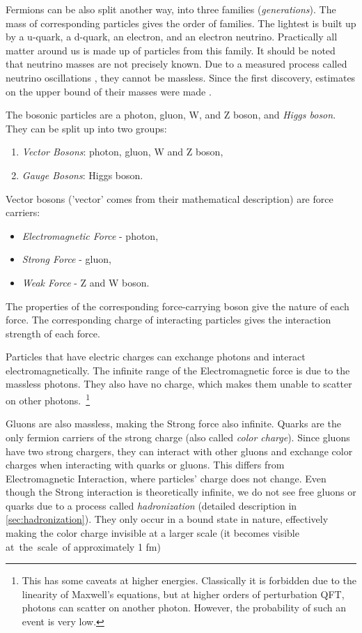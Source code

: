 Fermions can be also split another way, into three families (\emph{generations}). 
The mass of corresponding particles gives the order of families.
The lightest is built up by a u-quark, a d-quark, an electron, and an electron neutrino.
Practically all matter around us is made up of particles from this family.
It should be noted that neutrino masses are not precisely known.
Due to a measured process \cite{sadbury} called neutrino oscillations \cite{pdg}, they cannot be massless.
Since the first discovery, estimates on the upper bound of their masses were made \cite{pdg}.

The bosonic particles are a photon, gluon, W, and Z boson, and \emph{Higgs boson}. They can be split up into two groups:
\begin{enumerate}
    \item \emph{Vector Bosons}: photon, gluon, W and Z boson,
    \item \emph{Gauge Bosons}: Higgs boson.
\end{enumerate}
Vector bosons ('vector' comes from their mathematical description) are force carriers:
\begin{itemize}
    \item \emph{Electromagnetic Force} - photon,
    \item \emph{Strong Force} - gluon,
    \item \emph{Weak Force} - Z and W boson.
\end{itemize}
The properties of the corresponding force-carrying boson give the nature of each force.
The corresponding charge of interacting particles gives the interaction strength of each force.

Particles that have electric charges can exchange photons and interact electromagnetically.
The infinite range of the Electromagnetic force is due to the massless photons.
They also have no charge, which makes them unable to scatter on other photons.~\footnote{This has some caveats at higher energies. Classically it is forbidden due to the linearity of Maxwell's equations, but at higher orders of perturbation QFT, photons can scatter on another photon. However, the probability of such an event is very low.}

Gluons are also massless, making the Strong force also infinite.
Quarks are the only fermion carriers of the strong charge (also called \emph{color charge}). 
Since gluons have two strong chargers, they can interact with other gluons and exchange color charges when interacting with quarks or gluons.
This differs from Electromagnetic Interaction, where particles' charge does not change. 
Even though the Strong interaction is theoretically infinite, we do not see free gluons or quarks due to a process called \emph{hadronization} (detailed description in \cref{sec:hadronization}).
They only occur in a bound state in nature, effectively making the color charge invisible at a larger scale (it becomes visible at~the~scale~of approximately 1 fm)

